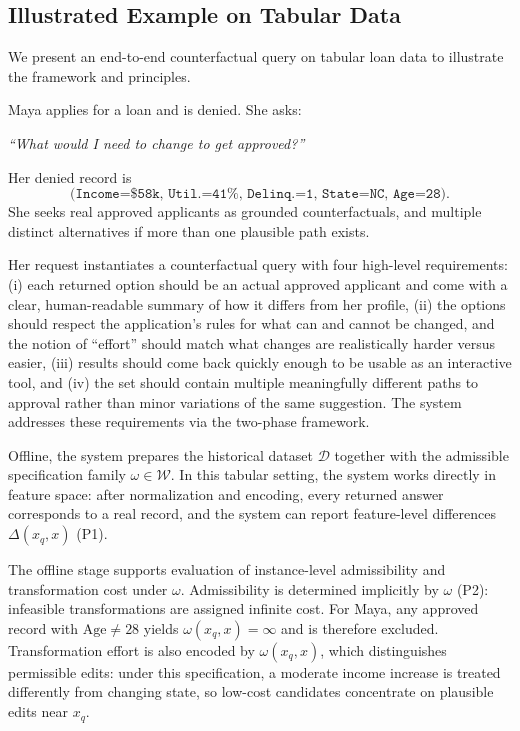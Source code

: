 \subsection{Illustrated Example on Tabular Data}
We present an end-to-end counterfactual query on tabular loan data to illustrate the framework and principles.


\begin{tcolorbox}[
    colback=gray!10,
    colframe=gray!60,
    boxrule=0.5pt,
    arc=3pt,
    left=6pt,
    right=6pt,
    top=6pt,
    bottom=6pt
]
Maya applies for a loan and is denied. She asks: 
\begin{center}
\emph{``What would I need to change to get approved?''}
\end{center}
Her denied record is
\begingroup\small
\begin{equation*}
\texttt{(Income=\$58k, Util.=41\%, Delinq.=1, State=NC, Age=28)}.
\end{equation*}
\endgroup
She seeks real approved applicants as grounded counterfactuals, and multiple distinct alternatives if more than one plausible path exists.
\end{tcolorbox}

Her request instantiates a counterfactual query with four high-level requirements: (i) each returned option should be an actual approved applicant and come with a clear, human-readable summary of how it differs from her profile, (ii) the options should respect the application’s rules for what can and cannot be changed, and the notion of ``effort'' should match what changes are realistically harder versus easier,
(iii) results should come back quickly enough to be usable as an interactive tool, and (iv) the set should contain multiple meaningfully different paths to approval rather than minor variations of the same suggestion. The system addresses these requirements via the two-phase framework.

Offline, the system prepares the historical dataset $\mathcal D$ together with the admissible specification family $\omega \in \mathcal W$. In this tabular setting, the system works directly in feature space: after normalization and encoding, every returned answer corresponds to a real record, and the system can report feature-level differences $\Delta(x_q,x)$ (P1).

The offline stage supports evaluation of instance-level admissibility and transformation cost under $\omega$. Admissibility is determined implicitly by $\omega$ (P2): infeasible transformations are assigned infinite cost. For Maya, any approved record with $\text{Age} \neq 28$ yields $\omega(x_q,x)=\infty$ and is therefore excluded. Transformation effort is also encoded by $\omega(x_q,x)$, which distinguishes permissible edits: under this specification, a moderate income increase is treated differently from changing state, so low-cost candidates concentrate on plausible edits near $x_q$.


